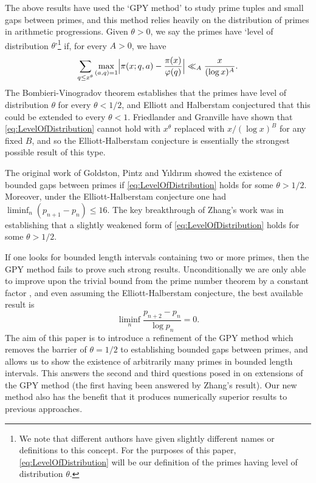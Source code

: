 \documentclass[12pt,a4paper]{amsart}
\theoremstyle{plain}
\numberwithin{sblmm}{thrm}
\numberwithin{equation}{section}
\renewcommand{\phi}{\varphi}
\begin{document}
The above results have used the `GPY method' to study prime tuples and small gaps between primes, and this method relies heavily on the distribution of primes in arithmetic progressions. Given $\theta>0$, we say the primes have `level of distribution $\theta$'\footnote{We note that different authors have given slightly different names or definitions to this concept. For the purposes of this paper, \eqref{eq:LevelOfDistribution} will be our definition of the primes having level of distribution $\theta$.} if, for every $A>0$, we have
\begin{equation}
\sum_{q\le x^\theta}\max_{(a,q)=1}\Bigl|\pi(x;q,a)-\frac{\pi(x)}{\phi(q)}\Bigr|\ll_A \frac{x}{(\log{x})^A}.\label{eq:LevelOfDistribution}
\end{equation} 
The Bombieri-Vinogradov theorem establishes that the primes have level of distribution $\theta$ for every $\theta<1/2$, and Elliott and Halberstam \cite{ElliottHalberstam} conjectured that this could be extended to every $\theta<1$. Friedlander and Granville \cite{FriedlanderGranville} have shown that \eqref{eq:LevelOfDistribution} cannot hold with $x^{\theta}$ replaced with $x/(\log{x})^B$ for any fixed $B$, and so the Elliott-Halberstam conjecture is essentially the strongest possible result of this type.

The original work of Goldston, Pintz and Y\i ld\i r\i m showed the existence of bounded gaps between primes if \eqref{eq:LevelOfDistribution} holds for some $\theta>1/2$. Moreover, under the Elliott-Halberstam conjecture one had $\liminf_n(p_{n+1}-p_n)\le 16$. The key breakthrough of Zhang's work was in establishing that a slightly weakened form of \eqref{eq:LevelOfDistribution} holds for some $\theta>1/2$.

If one looks for bounded length intervals containing two or more primes, then the GPY method fails to prove such strong results. Unconditionally we are only able to improve upon the trivial bound from the prime number theorem by a constant factor \cite{GPY:ManyPrimes}, and even assuming the Elliott-Halberstam conjecture, the best available result \cite{GPY} is
\begin{equation}
\liminf_n\frac{p_{n+2}-p_n}{\log{p_n}}=0.
\end{equation}
The aim of this paper is to introduce a refinement of the GPY method which removes the barrier of $\theta=1/2$ to establishing bounded gaps between primes, and allows us to show the existence of arbitrarily many primes in bounded length intervals. This answers the second and third questions posed in \cite{GPY} on extensions of the GPY method (the first having been answered by Zhang's result). Our new method also has the benefit that it produces numerically superior results to previous approaches.
\end{document}
